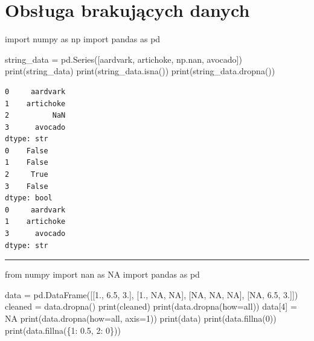 \documentclass[
  polish,
  letterpaper,
  DIV=11,
  numbers=noendperiod]{scrreprt}
\newenvironment{Shaded}{\begin{snugshade}}{\end{snugshade}}
\newcommand{\BuiltInTok}[1]{\textcolor[rgb]{0.00,0.23,0.31}{#1}}
\newcommand{\DecValTok}[1]{\textcolor[rgb]{0.68,0.00,0.00}{#1}}
\newcommand{\FloatTok}[1]{\textcolor[rgb]{0.68,0.00,0.00}{#1}}
\newcommand{\ImportTok}[1]{\textcolor[rgb]{0.00,0.46,0.62}{#1}}
\newcommand{\NormalTok}[1]{\textcolor[rgb]{0.00,0.23,0.31}{#1}}
\newcommand{\OperatorTok}[1]{\textcolor[rgb]{0.37,0.37,0.37}{#1}}
\newcommand{\StringTok}[1]{\textcolor[rgb]{0.13,0.47,0.30}{#1}}
\begin{document}
\section{Obsługa brakujących
danych}\label{obsux142uga-brakujux105cych-danych}

\begin{Shaded}
\begin{Highlighting}[]
\ImportTok{import}\NormalTok{ numpy }\ImportTok{as}\NormalTok{ np}
\ImportTok{import}\NormalTok{ pandas }\ImportTok{as}\NormalTok{ pd}

\NormalTok{string\_data }\OperatorTok{=}\NormalTok{ pd.Series([}\StringTok{\textquotesingle{}aardvark\textquotesingle{}}\NormalTok{, }\StringTok{\textquotesingle{}artichoke\textquotesingle{}}\NormalTok{, np.nan, }\StringTok{\textquotesingle{}avocado\textquotesingle{}}\NormalTok{])}
\BuiltInTok{print}\NormalTok{(string\_data)}
\BuiltInTok{print}\NormalTok{(string\_data.isna())}
\BuiltInTok{print}\NormalTok{(string\_data.dropna())}
\end{Highlighting}
\end{Shaded}

\begin{verbatim}
0     aardvark
1    artichoke
2          NaN
3      avocado
dtype: str
0    False
1    False
2     True
3    False
dtype: bool
0     aardvark
1    artichoke
3      avocado
dtype: str
\end{verbatim}

\begin{center}\rule{0.5\linewidth}{0.5pt}\end{center}

\begin{Shaded}
\begin{Highlighting}[]
\ImportTok{from}\NormalTok{ numpy }\ImportTok{import}\NormalTok{ nan }\ImportTok{as}\NormalTok{ NA}
\ImportTok{import}\NormalTok{ pandas }\ImportTok{as}\NormalTok{ pd}

\NormalTok{data }\OperatorTok{=}\NormalTok{ pd.DataFrame([[}\FloatTok{1.}\NormalTok{, }\FloatTok{6.5}\NormalTok{, }\FloatTok{3.}\NormalTok{], [}\FloatTok{1.}\NormalTok{, NA, NA],}
\NormalTok{                     [NA, NA, NA], [NA, }\FloatTok{6.5}\NormalTok{, }\FloatTok{3.}\NormalTok{]])}
\NormalTok{cleaned }\OperatorTok{=}\NormalTok{ data.dropna()}
\BuiltInTok{print}\NormalTok{(cleaned)}
\BuiltInTok{print}\NormalTok{(data.dropna(how}\OperatorTok{=}\StringTok{\textquotesingle{}all\textquotesingle{}}\NormalTok{))}
\NormalTok{data[}\DecValTok{4}\NormalTok{] }\OperatorTok{=}\NormalTok{ NA}
\BuiltInTok{print}\NormalTok{(data.dropna(how}\OperatorTok{=}\StringTok{\textquotesingle{}all\textquotesingle{}}\NormalTok{, axis}\OperatorTok{=}\DecValTok{1}\NormalTok{))}
\BuiltInTok{print}\NormalTok{(data)}
\BuiltInTok{print}\NormalTok{(data.fillna(}\DecValTok{0}\NormalTok{))}
\BuiltInTok{print}\NormalTok{(data.fillna(\{}\DecValTok{1}\NormalTok{: }\FloatTok{0.5}\NormalTok{, }\DecValTok{2}\NormalTok{: }\DecValTok{0}\NormalTok{\}))}
\end{Highlighting}
\end{Shaded}
\end{document}
